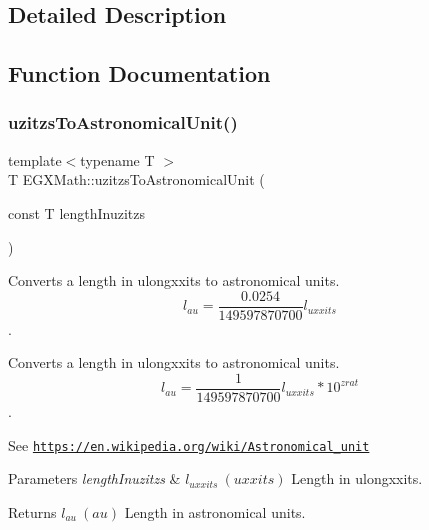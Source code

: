 \subsection{Detailed Description}


\subsection{Function Documentation}
\mbox{\label{group___e_g_x_math-_conversions-_length_conversions-_imperial-uzitzs-_astronomical_ga5b92a4634ad3e80173c05bc3ff39f079}} 
\subsubsection{\texorpdfstring{uzitzs\+To\+Astronomical\+Unit()}{uzitzsToAstronomicalUnit()}}
{\footnotesize\ttfamily template$<$typename T $>$ \\
T E\+G\+X\+Math\+::uzitzs\+To\+Astronomical\+Unit (\begin{DoxyParamCaption}\item[{const T}]{length\+Inuzitzs }\end{DoxyParamCaption})}



Converts a length in ulongxxits to astronomical units. \[ l_{au}= \frac{0.0254}{149597870700} l_{uxxits} \]. 

Converts a length in ulongxxits to astronomical units. \[ l_{au}= \frac{1}{149597870700} l_{uxxits} * 10^{zrat} \].

See \href{https://en.wikipedia.org/wiki/Astronomical_unit}{\tt https\+://en.\+wikipedia.\+org/wiki/\+Astronomical\+\_\+unit} 
\begin{DoxyParams}{Parameters}
{\em length\+Inuzitzs} & $ l_{uxxits}\ (uxxits)$ Length in ulongxxits. \\
\hline
\end{DoxyParams}
\begin{DoxyReturn}{Returns}
$ l_{au}\ (au)$ Length in astronomical units. 
\end{DoxyReturn}
\mbox{\label{group___e_g_x_math-_conversions-_length_conversions-_imperial-uzitzs-_astronomical_gaa6ada41d9c8a7516cb5fe8ab01976b27}} 
